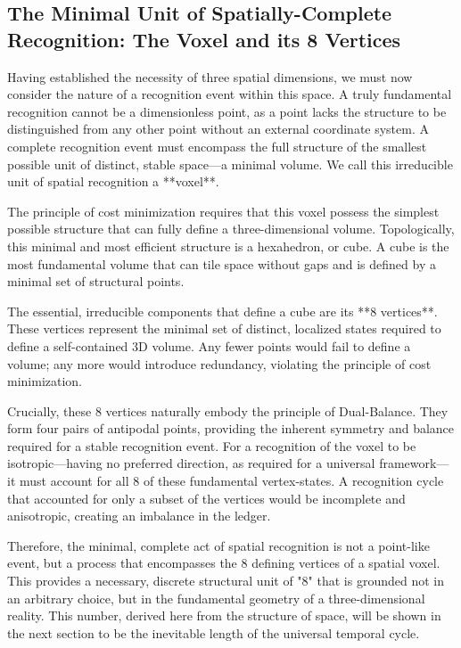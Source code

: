 \subsection{The Minimal Unit of Spatially-Complete Recognition: The Voxel and its 8 Vertices}
Having established the necessity of three spatial dimensions, we must now consider the nature of a recognition event within this space. A truly fundamental recognition cannot be a dimensionless point, as a point lacks the structure to be distinguished from any other point without an external coordinate system. A complete recognition event must encompass the full structure of the smallest possible unit of distinct, stable space—a minimal volume. We call this irreducible unit of spatial recognition a **voxel**.

The principle of cost minimization requires that this voxel possess the simplest possible structure that can fully define a three-dimensional volume. Topologically, this minimal and most efficient structure is a hexahedron, or cube. A cube is the most fundamental volume that can tile space without gaps and is defined by a minimal set of structural points.

The essential, irreducible components that define a cube are its **8 vertices**. These vertices represent the minimal set of distinct, localized states required to define a self-contained 3D volume. Any fewer points would fail to define a volume; any more would introduce redundancy, violating the principle of cost minimization.

Crucially, these 8 vertices naturally embody the principle of Dual-Balance. They form four pairs of antipodal points, providing the inherent symmetry and balance required for a stable recognition event. For a recognition of the voxel to be isotropic—having no preferred direction, as required for a universal framework—it must account for all 8 of these fundamental vertex-states. A recognition cycle that accounted for only a subset of the vertices would be incomplete and anisotropic, creating an imbalance in the ledger.

Therefore, the minimal, complete act of spatial recognition is not a point-like event, but a process that encompasses the 8 defining vertices of a spatial voxel. This provides a necessary, discrete structural unit of "8" that is grounded not in an arbitrary choice, but in the fundamental geometry of a three-dimensional reality. This number, derived here from the structure of space, will be shown in the next section to be the inevitable length of the universal temporal cycle.

